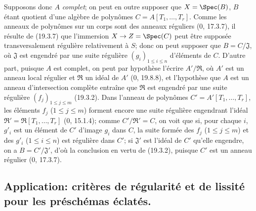 Supposons donc $A$ \emph{complet}; on peut en outre supposer que $X=\Spec(B)$, $B$ étant quotient d'une algèbre de polynômes $C=A[T_1,\ldots,T_r]$. Comme les anneaux de polynômes sur un corps sont des anneaux réguliers ($0$, 17.3.7), il résulte de (19.3.7) que l'immersion $X\to Z=\Spec(C)$ peut être supposée transversalement régulière relativement à $S$; donc on peut supposer que $B=C/\mathfrak J$, où $\mathfrak J$ est engendré par une suite régulière $(g_i)_{1\leq i\leq n}$ d'éléments de $C$. D'autre part, puisque $A$ est complet, on peut par hypothèse l'écrire $A'/\mathfrak R$, où $A'$ est un anneau local régulier et $\mathfrak R$ un idéal de $A'$ ($0$, 19.8.8), et l'hypothèse que $A$ est un anneau d'intersection complète entraîne que $\mathfrak R$ est engendré par une suite régulière $(f_j)_{1\leq j\leq m}$ (19.3.2). Dans l'anneau de polynômes $C'=A'[T_1,\ldots,T_r]$, les éléments $f_j$ ($1\leq j\leq m$) forment encore une suite régulière engendrant l'idéal $\mathfrak R'=\mathfrak R[T_1,\ldots,T_r]$ ($0$, 15.1.4); comme $C'/\mathfrak R'=C$, on voit que si, pour chaque $i$, $g'_i$ est un élément de $C'$ d'image $g_i$ dans $C$, la suite formée des $f_j$ ($1\leq j\leq m$) et des $g'_i$ ($1\leq i\leq n$) est régulière dans $C'$; si $\mathfrak J'$ est l'idéal de $C'$ qu'elle engendre, on a $B=C'/\mathfrak J'$, d'où la conclusion en vertu de (19.3.2), puisque $C'$ est un anneau régulier ($0$, 17.3.7).

\subsection{Application: critères de régularité et de lissité pour les préschémas éclatés.}



